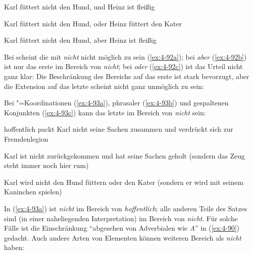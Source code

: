 \documentclass[output=paper]{langsci/langscibook}
\begin{document}
\begin{exe}
\ex
\label{ex:4-91}
\begin{xlist}
\ex%
\label{ex:4-91a}
Karl füttert nicht den Hund, und Heinz ist fleißig

\ex%
\label{ex:4-91b}
Karl füttert nicht den Hund, oder Heinz füttert den Kater

\ex%
\label{ex:4-91c}
Karl füttert nicht den Hund, aber Heinz ist fleißig
\end{xlist}
\end{exe}
Bei  scheint die  mit \textit{nicht} nicht möglich zu sein (\ref{ex:4-92a}); bei \textit{aber} (\ref{ex:4-92b}) ist nur das erste  im Bereich von \textit{nicht}; bei \textit{oder} (\ref{ex:4-92c}) ist das Urteil nicht ganz klar: Die Beschränkung des Bereichs auf das erste  ist stark bevorzugt, aber die Extension auf das letzte  scheint nicht ganz unmöglich zu sein:

\begin{exe}
\ex
\label{ex:4-92}
\begin{xlist}



\end{xlist}
\end{exe}
Bei "=Koordinationen (\ref{ex:4-93a}), phrasaler  (\ref{ex:4-93b}) und gespaltenen Konjunkten (\ref{ex:4-93c}) kann das letzte  im Bereich von \textit{nicht} sein:

\begin{exe}
\ex
\label{ex:4-93}
\begin{xlist}
\ex%
\label{ex:4-93a}
hoffentlich packt Karl nicht seine Sachen zusammen und verdrückt sich zur Fremdenlegion

\ex%
\label{ex:4-93b}
Karl ist nicht zurückgekommen und hat seine Sachen geholt (sondern das Zeug steht immer noch hier rum)

\ex%
\label{ex:4-93c}
Karl wird nicht den Hund füttern oder den Kater (sondern er wird mit seinem Kaninchen spielen)
\end{xlist}
\end{exe}
In (\ref{ex:4-93a}) ist \textit{nicht} im Bereich von \textit{hoffentlich}; alle anderen Teile des Satzes sind (in einer naheliegenden Interpretation) im Bereich von \textit{nicht}. Für solche Fälle ist die Einschränkung "`abgesehen von Adverbialen wie \textit{A}"' in (\ref{ex:4-90}) gedacht. Auch andere Arten von Elementen können weiteren Bereich als \textit{nicht} haben:
\end{document}

